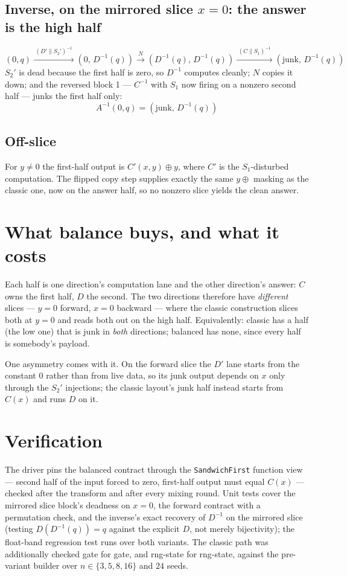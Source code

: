 \documentclass[11pt]{article}
\newcommand{\code}[1]{\texttt{#1}}
\begin{document}
\subsection*{Inverse, on the mirrored slice $x=0$: the answer is the high half}

\[
(0,q)
\xrightarrow{\;(D' \parallel S_2')^{-1}\;} (0,\,D^{-1}(q))
\xrightarrow{\;N\;} (D^{-1}(q),\,D^{-1}(q))
\xrightarrow{\;(C \parallel S_1)^{-1}\;} (\text{junk},\,D^{-1}(q))
\]
$S_2'$ is dead because the first half is zero, so $D^{-1}$ computes cleanly;
$N$ copies it down; and the reversed block 1 --- $C^{-1}$ with $S_1$ now firing
on a nonzero second half --- junks the first half only:
\[
\boxed{\;A^{-1}(0,q) = (\text{junk},\, D^{-1}(q))\;}
\]

\subsection*{Off-slice}

For $y \neq 0$ the first-half output is $C'(x,y) \oplus y$, where $C'$ is the
$S_1$-disturbed computation. The flipped copy step supplies exactly the same
$y\oplus$ masking as the classic one, now on the answer half, so no nonzero
slice yields the clean answer.

\section{What balance buys, and what it costs}

Each half is one direction's computation lane and the other direction's answer:
$C$ owns the first half, $D$ the second. The two directions therefore have
\emph{different} slices --- $y=0$ forward, $x=0$ backward --- where the classic
construction slices both at $y=0$ and reads both out on the high half.
Equivalently: classic has a half (the low one) that is junk in \emph{both}
directions; balanced has none, since every half is somebody's payload.

One asymmetry comes with it. On the forward slice the $D'$ lane starts from the
constant $0$ rather than from live data, so its junk output depends on $x$ only
through the $S_2'$ injections; the classic layout's junk half instead starts
from $C(x)$ and runs $D$ on it.

\section{Verification}

The driver pins the balanced contract through the \code{SandwichFirst} function
view --- second half of the input forced to zero, first-half output must equal
$C(x)$ --- checked after the transform and after every mixing round. Unit tests
cover the mirrored slice block's deadness on $x=0$, the forward contract with a
permutation check, and the inverse's exact recovery of $D^{-1}$ on the mirrored
slice (testing $D(D^{-1}(q)) = q$ against the explicit $D$, not merely
bijectivity); the float-band regression test runs over both variants. The
classic path was additionally checked gate for gate, and rng-state for
rng-state, against the pre-variant builder over $n \in \{3,5,8,16\}$ and $24$
seeds.
\end{document}
